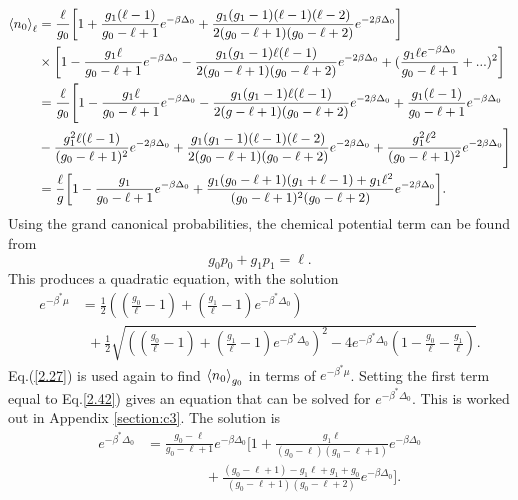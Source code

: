 \begin{align}
    \left<{n_0}\right>_\ell&=\frac{\ell}{g_0}\qty[1+\frac{g_1(\ell-1)}{g_0-\ell+1}e^{-\beta\Delta_0} +\frac{g_1(g_1-1)(\ell-1)(\ell-2)}{2(g_0-\ell+1)(g_0-\ell+2)}e^{-2\beta\Delta_0}]\nonumber\\
    &\times \qty[1-\frac{g_1\ell}{g_0-\ell+1}e^{-\beta\Delta_0}-\frac{g_1(g_1-1)\ell(\ell-1)}{2(g_0-\ell+1)(g_0-\ell+2)}e^{-2\beta\Delta_0}+(\frac{g_1 \ell e^{-\beta\Delta_0}}{g_0-\ell+1}+...)^2] \nonumber\\
    &=\frac{\ell}{g_0}\Biggr[1-\frac{g_1\ell}{g_0-\ell+1}e^{-\beta\Delta_0}-\frac{g_1(g_1-1)\ell(\ell-1)}{2(g-\ell+1)(g_0-\ell+2)}e^{-2\beta\Delta_0}+\frac{g_1(\ell-1)}{g_0-\ell+1}e^{-\beta\Delta_0}\nonumber\\
    &-\frac{g_1^2 \ell(\ell-1)}{(g_0-\ell+1)^2}e^{-2\beta\Delta_0}+\frac{g_1(g_1-1)(\ell-1)(\ell-2)}{2(g_0-\ell+1)(g_0-\ell+2)}e^{-2\beta\Delta_0}+\frac{g_1^2\ell^2}{(g_0-\ell+1)^2}e^{-2\beta\Delta_0}\Biggr]\nonumber\\
    &=\frac{\ell}{g}\qty[1-\frac{g_1}{g_0-\ell+1}e^{-\beta\Delta_0}+\frac{g_1(g_0-\ell+1)(g_1+\ell-1)+g_1\ell^2}{(g_0-\ell+1)^2(g_0-\ell+2)}e^{-2\beta\Delta_0}]. \label{2.39}
\end{align}          
Using the grand canonical probabilities, the chemical potential term can be found from
\begin{equation}
    g_0 p_0+g_1 p_1=\ell. \label{2.40}
\end{equation}
This produces a quadratic equation, with the solution
\begin{align}
    e^{-\beta^*\mu }&=\frac{1}{2}((\frac{g_0}{\ell}-1)+(\frac{g_1}{\ell}-1)e^{-\beta^*\Delta_0})\nonumber\\
    &\ \ +\frac{1}{2}\sqrt{((\frac{g_0}{\ell}-1)+(\frac{g_1}{\ell}-1)e^{-\beta^*\Delta_0})^2-4e^{-\beta^*\Delta_0}(1-\frac{g_0}{\ell}-\frac{g_1}{\ell})} . \label{2.42}
\end{align}
Eq.\@(\ref{2.27}) is used again to find $\left<{n_0}\right>_{g_0}$ in terms of $e^{-\beta^*\mu}$.
Setting the first term equal to Eq.\@ \ref{2.42}) gives an equation that can be solved for $e^{-\beta^*\Delta_0}$. This is worked out in Appendix \ref{section:c3}. The solution is
\begin{align}
    e^{-\beta^*\Delta_0}&=\frac{g_0-\ell}{g_0-\ell+1}e^{-\beta\Delta_0} \Biggr[1+\frac{g_1 \ell}{(g_0-\ell)(g_0-\ell+1)}e^{-\beta\Delta_0}\nonumber\\
    &\ \ \ \ \ \ \ \ \ \ \ \ \ \ \ \ \ \ \ +\frac{(g_0-\ell+1)-g_1\ell+g_1+g_0}{(g_0-\ell+1)(g_0-\ell+2)}e^{-\beta\Delta_0}\Biggr]. \label{2.42}
\end{align}
